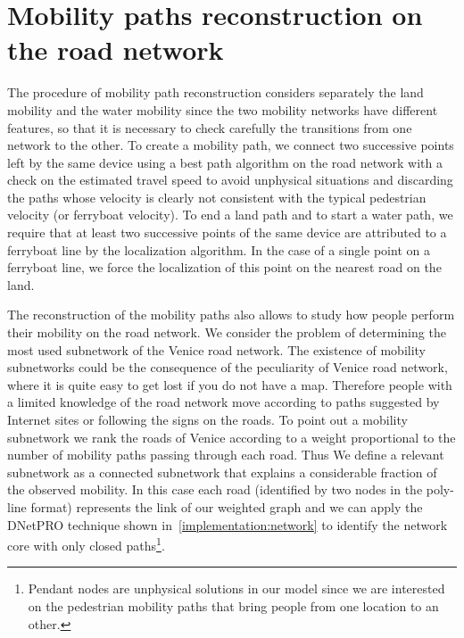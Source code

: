 \documentclass{standalone}
\begin{document}
\section*{Mobility paths reconstruction on the road network}

The procedure of mobility path reconstruction considers separately the land mobility and the water mobility since the two mobility networks have different features, so that it is necessary to check carefully the transitions from one network to the other.
To create a mobility path, we connect two successive points left by the same device using a best path algorithm on the road network with a check on the estimated travel speed to avoid unphysical situations and discarding the paths whose velocity is clearly not consistent with
the typical pedestrian velocity (or ferryboat velocity).
To end a land path and to start a water path, we require that at least two successive points of the same device are attributed to a ferryboat line by the localization algorithm.
In the case of a single point on a ferryboat line, we force the localization of this point on the nearest road on the land.

The reconstruction of the mobility paths also allows to study how people perform their mobility on the road network.
We consider the problem of determining the most used subnetwork of the Venice road network.
The existence of mobility subnetworks could be the consequence of the peculiarity of Venice road network, where it is quite easy to get lost
if you do not have a map.
Therefore people with a limited knowledge of the road network move according to paths suggested by Internet sites or following the signs on the roads.
To point out a mobility subnetwork we rank the roads of Venice according to a weight proportional to the number of mobility paths passing through each road.
Thus We define a relevant subnetwork as a connected subnetwork that explains a considerable fraction of the observed mobility.
In this case each road (identified by two nodes in the poly-line format) represents the link of our weighted graph and we can apply the DNetPRO technique shown in~\ref{implementation:network} to identify the network core with only closed paths\footnote{
  Pendant nodes are unphysical solutions in our model since we are interested on the pedestrian mobility paths that bring people from one location to an other.
}.

\end{document}
